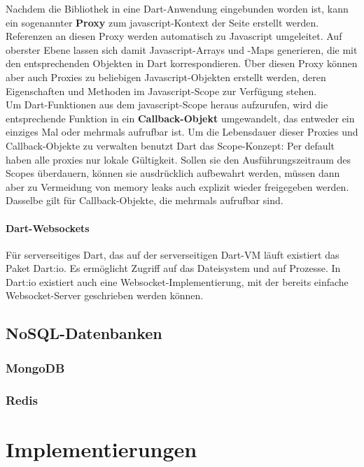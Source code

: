 Nachdem die Bibliothek in eine Dart-Anwendung eingebunden worden ist, kann ein sogenannter {\bf Proxy} zum javascript-Kontext der Seite erstellt werden. Referenzen an diesen Proxy werden automatisch zu Javascript umgeleitet. Auf oberster Ebene lassen sich damit Javascript-Arrays und -Maps generieren, die mit den entsprechenden Objekten in Dart korrespondieren. Über diesen Proxy können aber auch Proxies zu beliebigen Javascript-Objekten erstellt werden, deren Eigenschaften und Methoden im Javascript-Scope zur Verfügung stehen.\\

Um Dart-Funktionen aus dem javascript-Scope heraus aufzurufen, wird die entsprechende Funktion in ein {\bf Callback-Objekt} umgewandelt, das entweder ein einziges Mal oder mehrmals aufrufbar ist. Um die Lebensdauer dieser Proxies und Callback-Objekte zu verwalten benutzt Dart das Scope-Konzept: Per default haben alle proxies nur lokale Gültigkeit. Sollen sie den Ausführungszeitraum des Scopes überdauern, können sie ausdrücklich aufbewahrt werden, müssen dann aber zu Vermeidung von memory leaks auch explizit wieder freigegeben werden. Dasselbe gilt für Callback-Objekte, die mehrmals aufrufbar sind.

\subsubsection{Dart-Websockets}
Für serverseitiges Dart, das auf der serverseitigen Dart-VM läuft existiert das Paket Dart:io. Es ermöglicht Zugriff auf das Dateisystem und auf Prozesse. In Dart:io existiert auch eine Websocket-Implementierung, mit der bereits einfache Websocket-Server geschrieben werden können.


\section{NoSQL-Datenbanken}
\subsection{MongoDB}
\subsection{Redis}




\chapter{Implementierungen}\label{s.Implementierungen}


